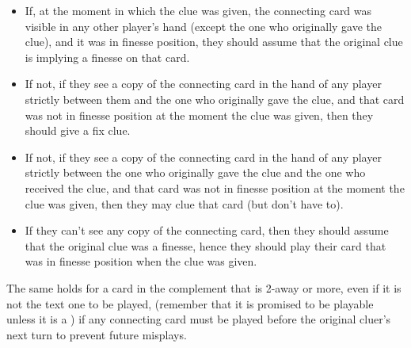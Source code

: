 \begin{itemize}
	\item If, at the moment in which the clue was given, the connecting card was visible in any other player's hand (except the one who originally gave the clue), and it was in finesse position, they should assume that the original clue is implying a finesse on that card.
	\item If not, if they see a copy of the connecting card in the hand of any player strictly between them and the one who originally gave the clue, and that card was not in finesse position at the moment the clue was given, then they should give a fix clue.
	\item If not, if they see a copy of the connecting card in the hand of any player strictly between the one who originally gave the clue and the one who received the clue, and that card was not in finesse position at the moment the clue was given, then they may clue that card (but don't have to).
	\item If they can't see any copy of the connecting card, then they should assume that the original clue was a finesse, hence they should play their card that was in finesse position when the clue was given.
\end{itemize}

The same holds for a card in the complement that is 2-away or more, even if it is not the text one to be played, (remember that it is promised to be playable unless it is a ) if any connecting card must be played before the original cluer's next turn to prevent future misplays.